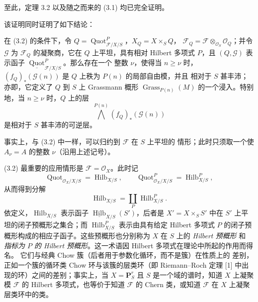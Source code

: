 至此，定理 3.2 以及随之而来的 (3.1) 均已完全证明。

该证明同时证明了如下结论：

 在 (3.2) 的条件下，令
$Q=\operatorname{Quot}^P_{\mathcal F/X/S}$，$X_Q=X\times_SQ$，
$\mathcal F_Q=\mathcal F\otimes_{\mathcal O_S}\mathcal O_Q$；并令
$\mathcal G$ 为 $\mathcal F_Q$ 的凝聚商，它在 $Q$ 上平坦，具有相对
Hilbert 多项式 $P$，且 $(Q,\mathcal G)$ 表示函子
$\underline{\operatorname{Quot}}^P_{\mathcal F/X/S}$。那么存在一个
整数 $\nu$，使得当 $n\geq\nu$ 时，
$(f_Q)_*(\mathcal G(n))$ 是 $Q$ 上秩为 $P(n)$ 的局部自由模，并且
相对于 $S$ 甚丰沛；亦即，它定义了 $Q$ 到 $S$ 上 Grassmann 概形
$\operatorname{Grass}_{P(n)}(M)$ 的一个浸入。特别地，当
$n\geq\nu$ 时，$Q$ 上的层
\[
\bigwedge^{P(n)}(f_Q)_*(\mathcal G(n))
\]
是相对于 $S$ 甚丰沛的可逆层。

事实上，与 (3.2) 中一样，可以归约到 $\mathcal F$ 在 $S$ 上平坦的
情形；此时只须取一个使 $A_\nu=A$ 的整数 $\nu$（沿用上述记号）。

(3.2) 最重要的应用情形是 $\mathcal F=\mathcal O_X$。此时记
\[
\operatorname{Quot}_{\mathcal O_X/X/S}=\operatorname{Hilb}_{X/S},
\qquad
\operatorname{Quot}^P_{\mathcal O_X/X/S}=\operatorname{Hilb}^P_{X/S},
\]
从而得到分解
\[
\operatorname{Hilb}_{X/S}=\coprod_P\operatorname{Hilb}^P_{X/S}.
\]
依定义，$\operatorname{Hilb}_{X/S}$ 表示函子
$\underline{\operatorname{Hilb}}_{X/S}(S')$，后者是
$X'=X\times_SS'$ 中在 $S'$ 上平坦的闭子预概形之集合；而
$\operatorname{Hilb}^P_{X/S}$ 表示由具有给定 Hilbert 多项式 $P$
的闭子预概形构成的相应子函子。这些预概形也分别称为 $X$ 在 $S$
上的 \emph{Hilbert 预概形} 和 \emph{指标为 $P$ 的 Hilbert
预概形}。这一术语因 Hilbert 多项式在理论中所起的作用而得名。
它们与经典 Chow 簇（后者用于参数化循环，而不是簇）在性质上的
差别，正如一个簇的循环类 Chow 环与该簇的层类环（即
Riemann--Roch 定理 [1] 中出现的环）之间的差别；事实上，当
$X=\mathbf P^r_S$ 且 $S$ 是一个域的谱时，知道 $X$ 上凝聚模
$\mathcal F$ 的 Hilbert 多项式，也等价于知道 $\mathcal F$ 的
Chern 类，或知道 $\mathcal F$ 在 $X$ 上凝聚层类环中的类。

